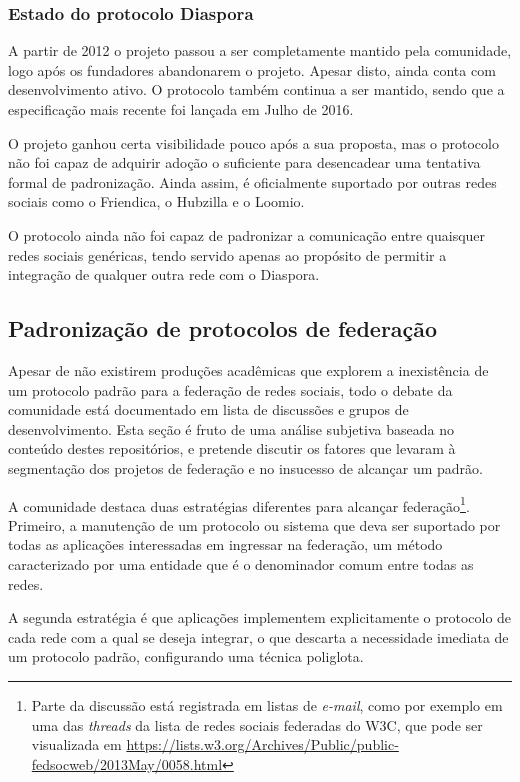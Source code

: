 \subsubsection{Estado do protocolo Diaspora}

A partir de 2012 o projeto passou a ser completamente mantido pela comunidade, logo
após os fundadores abandonarem o projeto. Apesar disto, ainda conta com
desenvolvimento ativo. O protocolo também continua a ser mantido, sendo que a
especificação mais recente foi lançada em Julho de 2016.

O projeto ganhou certa visibilidade pouco após a sua proposta, mas o protocolo não
foi capaz de adquirir adoção o suficiente para desencadear uma tentativa formal de
padronização. Ainda assim, é oficialmente suportado por outras redes sociais como o
Friendica, o Hubzilla e o Loomio.

O protocolo ainda não foi capaz de padronizar a comunicação entre quaisquer redes
sociais genéricas, tendo servido apenas ao propósito de permitir a integração
de qualquer outra rede com o Diaspora.


\subsection{Padronização de protocolos de federação}

Apesar de não existirem produções acadêmicas que explorem a inexistência de um
protocolo padrão para a federação de redes sociais, todo o debate da comunidade está
documentado em lista de discussões e grupos de desenvolvimento. Esta seção é fruto
de uma análise subjetiva baseada no conteúdo destes repositórios, e pretende
discutir os fatores que levaram à segmentação dos projetos de federação e no
insucesso de alcançar um padrão.

A comunidade destaca duas estratégias diferentes para alcançar
federação\footnote{Parte da discussão está registrada em listas de \textit{e-mail},
como por exemplo em uma das \textit{threads} da lista de redes sociais federadas do
W3C, que pode ser visualizada em
\url{https://lists.w3.org/Archives/Public/public-fedsocweb/2013May/0058.html}}.
Primeiro, a manutenção de um protocolo ou sistema que deva ser suportado por todas
as aplicações interessadas em ingressar na federação, um método caracterizado por
uma entidade que é o denominador comum entre todas as redes.

A segunda estratégia é que aplicações implementem explicitamente o protocolo de cada
rede com a qual se deseja integrar, o que descarta a necessidade imediata de um
protocolo padrão, configurando uma técnica poliglota.

